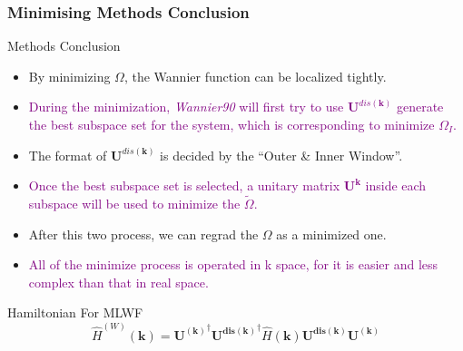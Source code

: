 \documentclass{beamer}
\begin{document}
  \begin{frame}
    \frametitle{Minimising Methods Conclusion}
    \small
    \begin{block}{Methods Conclusion}
      \begin{itemize}
        \item  By minimizing \(\Omega\), the Wannier function can be localized tightly.
        \item \textcolor{purple}{During the minimization, \emph{Wannier90} will first try to use \(\mathbf{U}^{dis(\mathbf{k})}\) generate the best subspace set for the system, which is corresponding to minimize \(\Omega_I\). }
        \item The format of \(\mathbf{U}^{dis(\mathbf{k})}\) is decided by the ``Outer \& Inner Window''.
        \item  \textcolor{purple}{Once the best subspace set is selected, a unitary matrix \(\mathbf{U}^{\mathbf{k}}\) inside each subspace will be used to minimize the \(\widetilde{\Omega}\).}
        \item After this two process, we can regrad the \(\Omega\) as a minimized one.
        \item \textcolor{purple}{All of the minimize process is operated in k space, for it is easier and less complex than that in real space.}
      \end{itemize}
    \end{block}

    \begin{block}{Hamiltonian For MLWF}
      \begin{equation}
        \widehat{H}^{(W)}(\mathbf{k}) = \mathbf{U^{(\mathbf{k})}}^\dagger\mathbf{U^{dis(\mathbf{k})}}^\dagger\widehat{H}(\mathbf{k})\mathbf{U^{dis(\mathbf{k})}}\mathbf{U^{(\mathbf{k})}}
      \end{equation}
    \end{block}

  \end{frame}
\end{document}
